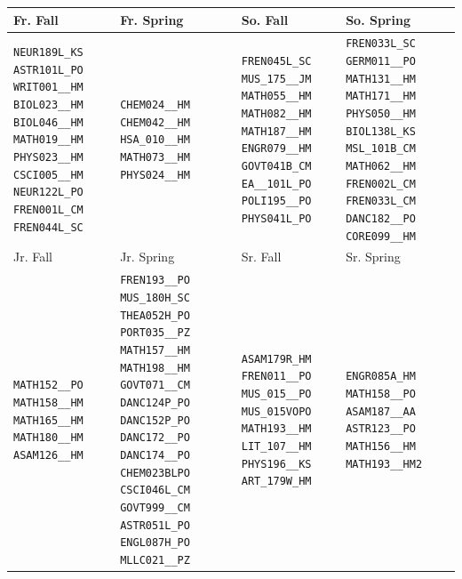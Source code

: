 \begin{tabular}{|p{}|p{}|p{}|p{}|}
    \hline
    Fr. Fall & Fr. Spring & So. Fall & So. Spring\\\hline
    \verb|NEUR189L_KS| \verb|ASTR101L_PO| \verb|WRIT001__HM| \verb|BIOL023__HM| \verb|BIOL046__HM| \verb|MATH019__HM| \verb|PHYS023__HM| \verb|CSCI005__HM| \verb|NEUR122L_PO| \verb|FREN001L_CM| \verb|FREN044L_SC|&
    \verb|CHEM024__HM| \verb|CHEM042__HM| \verb|HSA_010__HM| \verb|MATH073__HM| \verb|PHYS024__HM|&
    \verb|FREN045L_SC| \verb|MUS_175__JM| \verb|MATH055__HM| \verb|MATH082__HM| \verb|MATH187__HM| \verb|ENGR079__HM| \verb|GOVT041B_CM| \verb|EA__101L_PO| \verb|POLI195__PO| \verb|PHYS041L_PO|&
    \verb|FREN033L_SC| \verb|GERM011__PO| \verb|MATH131__HM| \verb|MATH171__HM| \verb|PHYS050__HM| \verb|BIOL138L_KS| \verb|MSL_101B_CM| \verb|MATH062__HM| \verb|FREN002L_CM| \verb|FREN033L_CM| \verb|DANC182__PO| \verb|CORE099__HM|\\
    \hline
    Jr. Fall & Jr. Spring & Sr. Fall & Sr. Spring\\\hline
    \verb|MATH152__PO| \verb|MATH158__HM| \verb|MATH165__HM| \verb|MATH180__HM| \verb|ASAM126__HM|&
    \verb|FREN193__PO| \verb|MUS_180H_SC| \verb|THEA052H_PO| \verb|PORT035__PZ| \verb|MATH157__HM| \verb|MATH198__HM| \verb|GOVT071__CM| \verb|DANC124P_PO| \verb|DANC152P_PO| \verb|DANC172__PO| \verb|DANC174__PO| \verb|CHEM023BLPO| \verb|CSCI046L_CM| \verb|GOVT999__CM| \verb|ASTR051L_PO| \verb|ENGL087H_PO| \verb|MLLC021__PZ|&
    \verb|ASAM179R_HM| \verb|FREN011__PO| \verb|MUS_015__PO| \verb|MUS_015VOPO| \verb|MATH193__HM| \verb|LIT_107__HM| \verb|PHYS196__KS| \verb|ART_179W_HM|&
    \verb|ENGR085A_HM| \verb|MATH158__PO| \verb|ASAM187__AA| \verb|ASTR123__PO| \verb|MATH156__HM| \verb|MATH193__HM2|\\
    \hline
\end{tabular}